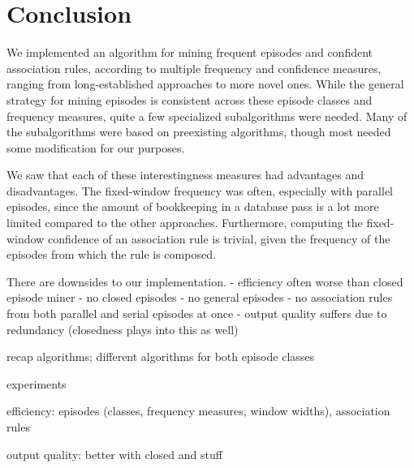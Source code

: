 \chapter{Conclusion}


We implemented an algorithm for mining frequent episodes and confident association rules, according to multiple frequency and confidence measures, ranging from long-established approaches to more novel ones. While the general strategy for mining episodes is consistent across these episode classes and frequency measures, quite a few specialized subalgorithms were needed. Many of the subalgorithms were based on preexisting algorithms, though most needed some modification for our purposes.


We saw that each of these interestingness measures had advantages and disadvantages. The fixed-window frequency was often, especially with parallel episodes, since the amount of bookkeeping in a database pass is a lot more limited compared to the other approaches. Furthermore, computing the fixed-window confidence of an association rule is trivial, given the frequency of the episodes from which the rule is composed.


There are downsides to our implementation.
- efficiency often worse than closed episode miner
- no closed episodes
- no general episodes
- no association rules from both parallel and serial episodes at once
- output quality suffers due to redundancy (closedness plays into this as well)

recap algorithms; different algorithms for both episode classes

experiments

efficiency: episodes (classes, frequency measures, window widths), association rules

output quality: better with closed and stuff
